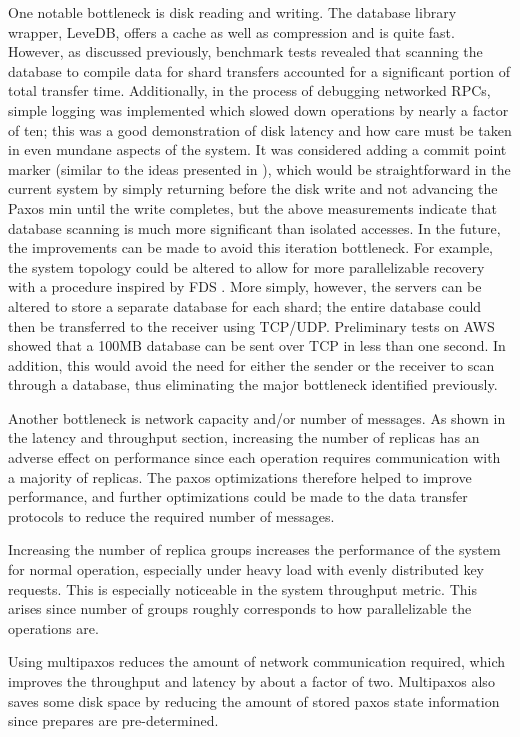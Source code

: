 \documentclass[letterpaper,10pt]{article}
\begin{document}
\begin{itemize}
One notable bottleneck is disk reading and writing.  The database library wrapper, LeveDB, offers a cache as well as compression and is quite fast.  However, as discussed previously, benchmark tests revealed that scanning the database to compile data for shard transfers accounted for a significant portion of total transfer time.  Additionally, in the process of debugging networked RPCs, simple logging was implemented which slowed down operations by nearly a factor of ten; this was a good demonstration of disk latency and how care must be taken in even mundane aspects of the system.  It was considered adding a commit point marker (similar to the ideas presented in \cite{harp}), which would be straightforward in the current system by simply returning before the disk write and not advancing the Paxos min until the write completes, but the above measurements indicate that database scanning is much more significant than isolated accesses.  In the future, the improvements can be made to avoid this iteration bottleneck.  For example, the system topology could be altered to allow for more parallelizable recovery with a procedure inspired by FDS \cite{fds}.  More simply, however, the servers can be altered to store a separate database for each shard; the entire database could then be transferred to the receiver using TCP/UDP.  Preliminary tests on AWS showed that a 100MB database can be sent over TCP in less than one second.  In addition, this would avoid the need for either the sender or the receiver to scan through a database, thus eliminating the major bottleneck identified previously.  

Another bottleneck is network capacity and/or number of messages.  As shown in the latency and throughput section, increasing the number of replicas has an adverse effect on performance since each operation requires communication with a majority of replicas.  The paxos optimizations therefore helped to improve performance, and further optimizations could be made to the data transfer protocols to reduce the required number of messages.

Increasing the number of replica groups increases the performance of the system for normal operation, especially under heavy load with evenly distributed key requests. This is especially noticeable in the system throughput metric.  This arises since number of groups roughly corresponds to how parallelizable the operations are.

Using multipaxos reduces the amount of network communication required, which improves the throughput and latency by about a factor of two. Multipaxos also saves some disk space by reducing the amount of stored paxos state information since prepares are pre-determined.  


\end{itemize}
\end{document}
